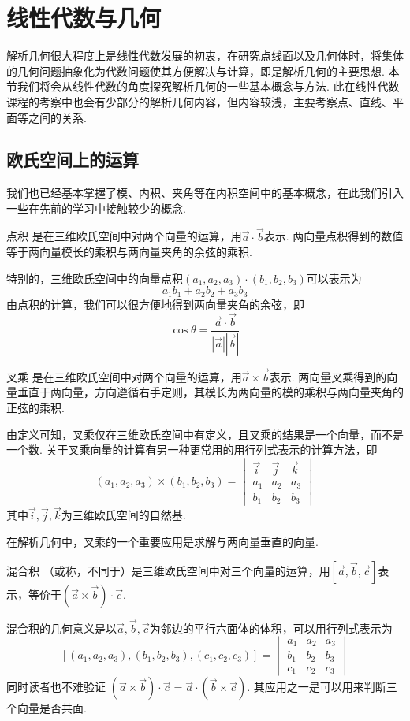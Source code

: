 \chapter{线性代数与几何}

解析几何很大程度上是线性代数发展的初衷，在研究点线面以及几何体时，将集体的几何问题抽象化为代数问题使其方便解决与计算，即是解析几何的主要思想. 本节我们将会从线性代数的角度探究解析几何的一些基本概念与方法. 此在线性代数课程的考察中也会有少部分的解析几何内容，但内容较浅，主要考察点、直线、平面等之间的关系.

\section{欧氏空间上的运算}

我们也已经基本掌握了模、内积、夹角等在内积空间中的基本概念，在此我们引入一些在先前的学习中接触较少的概念.
\begin{definition}{点积}{} 
    是在三维欧氏空间中对两个向量的运算，用$\vec{a}\cdot\vec{b}$表示. 两向量点积得到的数值等于两向量模长的乘积与两向量夹角的余弦的乘积.
\end{definition}
特别的，三维欧氏空间中的向量点积$(a_1,a_2,a_3)\cdot(b_1,b_2,b_3)$可以表示为\[a_1b_1+a_2b_2+a_3b_3\]
由点积的计算，我们可以很方便地得到两向量夹角的余弦，即\[\cos\theta=\frac{\vec{a}\cdot\vec{b}}{|\vec{a}||\vec{b}|}\]
\begin{definition}{叉乘}{} 
    是在三维欧氏空间中对两个向量的运算，用$\vec{a}\times\vec{b}$表示. 两向量叉乘得到的向量垂直于两向量，方向遵循右手定则，其模长为两向量的模的乘积与两向量夹角的正弦的乘积.
\end{definition}
由定义可知，叉乘仅在三维欧氏空间中有定义，且叉乘的结果是一个向量，而不是一个数. 关于叉乘向量的计算有另一种更常用的用行列式表示的计算方法，即
\[(a_1,a_2,a_3)\times(b_1,b_2,b_3)=\begin{vmatrix}
        \vec{i} & \vec{j} & \vec{k} \\
        a_1     & a_2     & a_3     \\
        b_1     & b_2     & b_3
    \end{vmatrix}\]
其中$\vec{i},\vec{j},\vec{k}$为三维欧氏空间的自然基.

在解析几何中，叉乘的一个重要应用是求解与两向量垂直的向量.
\begin{definition}{混合积}{}  
    （或称，不同于）是三维欧氏空间中对三个向量的运算，用$[\vec{a},\vec{b},\vec{c}]$表示，等价于$(\vec{a}\times\vec{b})\cdot\vec{c}$.
\end{definition}
混合积的几何意义是以$\vec{a},\vec{b},\vec{c}$为邻边的平行六面体的体积，可以用行列式表示为
\[[(a_1,a_2,a_3),(b_1,b_2,b_3),(c_1,c_2,c_3)]=\begin{vmatrix}
        a_1 & a_2 & a_3 \\
        b_1 & b_2 & b_3 \\
        c_1 & c_2 & c_3
    \end{vmatrix}\]
同时读者也不难验证 $ (\vec{a}\times\vec{b})\cdot\vec{c} = \vec{a}\cdot(\vec{b}\times\vec{c}) $. 其应用之一是可以用来判断三个向量是否共面.

